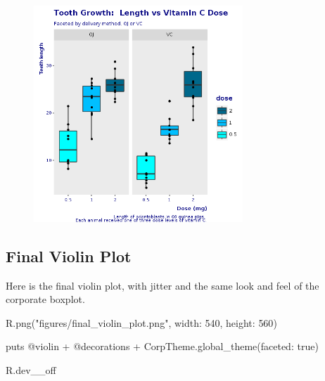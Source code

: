 \documentclass[11pt,]{article}
\newenvironment{Shaded}{\begin{snugshade}}{\end{snugshade}}
\newcommand{\DataTypeTok}[1]{\textcolor[rgb]{0.13,0.29,0.53}{#1}}
\newcommand{\DecValTok}[1]{\textcolor[rgb]{0.00,0.00,0.81}{#1}}
\newcommand{\StringTok}[1]{\textcolor[rgb]{0.31,0.60,0.02}{#1}}
\newcommand{\OtherTok}[1]{\textcolor[rgb]{0.56,0.35,0.01}{#1}}
\newcommand{\NormalTok}[1]{#1}
\begin{document}
\begin{figure}
\centering
\includegraphics[width=0.70000\textwidth]{figures/final_box_plot.png}
\caption{}
\end{figure}

\subsection{Final Violin Plot}\label{final-violin-plot}

Here is the final violin plot, with jitter and the same look and feel of
the corporate boxplot.

\begin{Shaded}
\begin{Highlighting}[]
\NormalTok{R.png(}\StringTok{"figures/final_violin_plot.png"}\NormalTok{, }\StringTok{width: }\DecValTok{540}\NormalTok{, }\StringTok{height: }\DecValTok{560}\NormalTok{)}

\NormalTok{puts }\OtherTok{@violin}\NormalTok{ + }\OtherTok{@decorations}\NormalTok{ + }\DataTypeTok{CorpTheme}\NormalTok{.global_theme(}\StringTok{faceted: }\DecValTok{true}\NormalTok{)}

\NormalTok{R.dev__off}
\end{Highlighting}
\end{Shaded}
\end{document}
